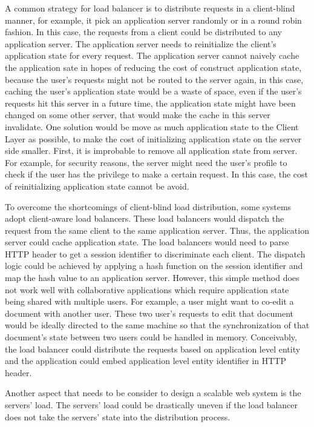 A common strategy for load balancer is to distribute requests in a client-blind manner,
for example, it pick an application server randomly or in a round robin fashion.
In this case, the requests from a client could be distributed to any application server.
The application server needs to reinitialize the client's application state for every request.
The application server cannot naively cache the application sate in hopes of reducing the
cost of construct application state, 
because the user's requests might not be routed to the server again, 
in this case, caching the user's application state would be a waste of space,
even if the user's requests hit this server in a future time,
the application state might have been changed on some other server,
that would make the cache in this server invalidate.
One solution would be move as much application state to the Client Layer as possible,
to make the cost of initializing application state on the server side smaller.
First, it is improbable to remove all application state from server.
For example, for security reasons, 
the server might need the user's profile to check if the user has 
the privilege to make a certain request.
In this case, the cost of reinitializing application state cannot be avoid.

To overcome the shortcomings of client-blind load distribution,
some systems adopt client-aware load balancers.
These load balancers would dispatch the request from the same
client to the same application server.
Thus, the application server could cache application state.
The load balancers would need to parse HTTP header to get
a session identifier to discriminate each client.
The dispatch logic could be achieved by applying a hash function
on the session identifier and map the hash value to an application server.
However, 
this simple method does not work well with collaborative applications
which require application state being shared with multiple users.
For example, a user might want to co-edit a document with another user.
These two user's requests to edit that document would be ideally directed to the same machine 
so that the synchronization of that document's state between two users
could be handled in memory.
Conceivably, the load balancer could distribute the requests based on
application level entity and the application could embed application level
entity identifier in HTTP header.

Another aspect that needs to be consider to design a scalable web system
is the servers' load.
The servers' load could be drastically uneven if the load balancer
does not take the servers' state into the distribution process.

